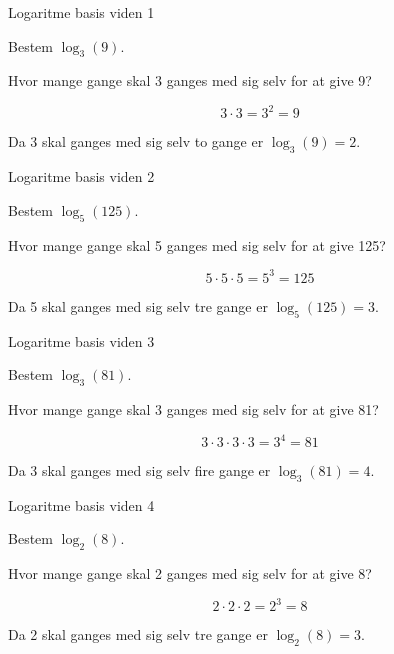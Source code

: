 \documentclass{article}
\begin{document}
\tableofcontents
\newpage

\begin{exercise}{Logaritme basis viden 1}

Bestem $\log_{3}(9)$.


\hint
Hvor mange gange skal 3 ganges med sig selv for at give 9?

\hint
\[
3 \cdot 3 = 3^2 = 9
\]

\hint
Da 3 skal ganges med sig selv to gange er 
$\log_3(9) = 2$.

\end{exercise}

\newpage


\begin{exercise}{Logaritme basis viden 2}

Bestem $\log_{5}(125)$.


\hint
Hvor mange gange skal 5 ganges med sig selv for at give 125?

\hint
\[
5 \cdot 5 \cdot 5 = 5^3 = 125
\]

\hint
Da 5 skal ganges med sig selv tre gange er 
$\log_5(125) = 3$.

\end{exercise}

\newpage


\begin{exercise}{Logaritme basis viden 3}

Bestem $\log_{3}(81)$.


\hint
Hvor mange gange skal 3 ganges med sig selv for at give 81?

\hint
\[
3 \cdot 3 \cdot 3 \cdot 3 = 3^4 = 81
\]

\hint
Da 3 skal ganges med sig selv fire gange er 
$\log_3(81) = 4$.

\end{exercise}

\newpage


\begin{exercise}{Logaritme basis viden 4}

Bestem $\log_{2}(8)$.


\hint
Hvor mange gange skal 2 ganges med sig selv for at give 8?

\hint
\[
2 \cdot 2 \cdot 2 = 2^3 = 8
\]

\hint
Da 2 skal ganges med sig selv tre gange er 
$\log_2(8) = 3$.

\end{exercise}
\end{document}
